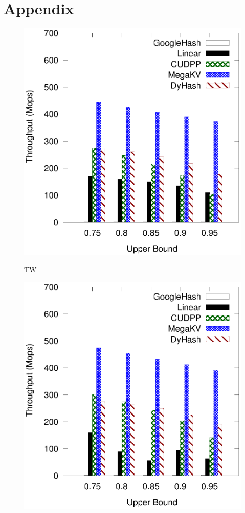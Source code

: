 

\section*{Appendix}

\begin{figure}[h]
	\begin{minipage}{0.19\linewidth}\centering
		\includegraphics[width=\linewidth]{pic/static-upper/upper_insert_twitter.eps}
		\centerline{TW}
	\end{minipage}
	\hfill
	\begin{minipage}{0.19\linewidth}\centering
		\includegraphics[width=\linewidth]{pic/static-upper/upper_insert_reddit.eps}

\end{minipage}
\end{figure}
